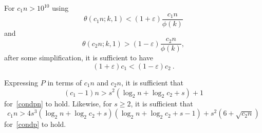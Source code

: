 For $c_1n>10^{10}$ using \[\theta(c_1n;k,1) < (1+\varepsilon)
\frac{c_1n}{\phi(k)}
\]
and \[\theta(c_2n;k,1) > (1-\varepsilon)\frac{c_2n}{\phi(k)},
\] after some simplification, it is sufficient to have
\begin{equation}\label{cond1a}
(1+\varepsilon)c_1 < (1-\varepsilon)c_2~.
\end{equation}

 Expressing $P$ in terms of $c_1n$ and $c_2n$, it is
sufficient that
\begin{equation}\label{cond2}
(c_1-1)n > s^2(\log_2n+\log_2c_2+s)+1
\end{equation}
for~\eqref{condpn} to hold. Likewise, for $s \geq 2$, it is
sufficient that
\begin{equation}\label{cond3}
c_1n>4s^3(\log_2n+\log_2c_2+s)(\log_2n+\log_2c_2+s-1)+s^2(6+\sqrt{c_2n})
\end{equation}
for~\eqref{condp} to hold.




